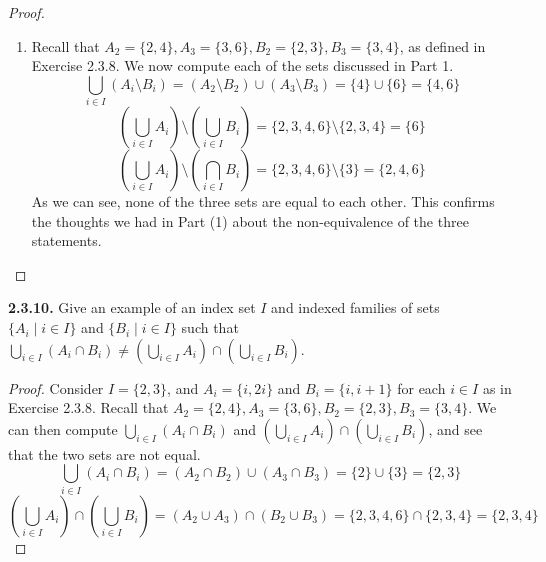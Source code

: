 \documentclass[12pt]{amsart}
\newenvironment{statement}[1]{\smallskip\noindent\color[rgb]{.6627, .3529, .6314} {\bf #1.}}{}
\theoremstyle{definition}
\theoremstyle{remark}
\begin{document}
\begin{proof}
\begin{enumerate}
	\item Recall that $A_2 = \{ 2, 4 \}, A_3 = \{ 3, 6 \}, B_2 = \{ 2, 3 \}, B_3 = \{ 3, 4 \}$,
	as defined in Exercise 2.3.8.
	We now compute each of the sets discussed in Part 1.
	\begin{equation*}
		\bigcup_{i \in I} (A_i \setminus B_i)
		= (A_2 \setminus B_2) \cup (A_3 \setminus B_3)
		= \{ 4 \} \cup \{ 6 \}
		= \{ 4, 6 \}
	\end{equation*}
	\begin{equation*}
		\left( \bigcup_{i \in I} A_i \right) \setminus \left( \bigcup_{i \in I} B_i \right)
		= \{ 2, 3, 4, 6 \} \setminus \{ 2, 3, 4 \}
		= \{ 6 \}
	\end{equation*}
	\begin{equation*}
		\left( \bigcup_{i \in I} A_i \right) \setminus \left( \bigcap_{i \in I} B_i \right)
		= \{ 2, 3, 4, 6 \} \setminus \{ 3 \}
		= \{ 2, 4, 6 \}
	\end{equation*}
	As we can see, none of the three sets are equal to each other.
	This confirms the thoughts we had in Part (1) about the non-equivalence of the three statements.
\end{enumerate}
\end{proof}


\begin{statement}{2.3.10}
Give an example of an index set $I$ and indexed families of sets
$\{ A_i \mid i \in I \}$ and $\{ B_i \mid i \in I \}$
such that
$\bigcup_{i \in I} (A_i \cap B_i) \neq
\left( \bigcup_{i \in I} A_i \right) \cap \left( \bigcup_{i \in I} B_i \right)$.
\end{statement}

\begin{proof}
Consider $I = \{ 2, 3 \}$, and $A_i = \{ i, 2i \}$ and $B_i = \{ i, i + 1 \}$ for each $i \in I$
as in Exercise 2.3.8.
Recall that $A_2 = \{ 2, 4 \}, A_3 = \{ 3, 6 \}, B_2 = \{ 2, 3 \}, B_3 = \{ 3, 4 \}$.
We can then compute $\bigcup_{i \in I} (A_i \cap B_i)$ and
$\left( \bigcup_{i \in I} A_i \right) \cap \left( \bigcup_{i \in I} B_i \right)$,
and see that the two sets are not equal.
\begin{equation*}
	\bigcup_{i \in I} (A_i \cap B_i)
	= (A_2 \cap B_2) \cup (A_3 \cap B_3)
	= \{ 2 \} \cup \{ 3 \}
	= \{ 2, 3 \}
\end{equation*}
\begin{equation*}
	\left( \bigcup_{i \in I} A_i \right) \cap \left( \bigcup_{i \in I} B_i \right)
	= (A_2 \cup A_3) \cap (B_2 \cup B_3)
	= \{ 2, 3, 4, 6 \} \cap \{ 2, 3, 4 \}
	= \{ 2, 3, 4 \}
\end{equation*}
\end{proof}
\end{document}
